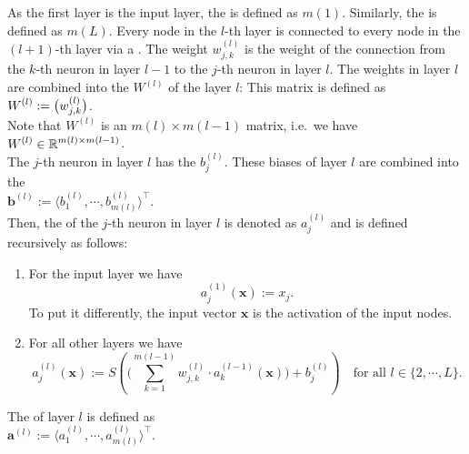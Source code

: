 As the first layer is the input layer, the  is defined as
$m(1)$.  Similarly, the  is defined as $m(L)$.
Every node in the $l$-th layer is connected to every node in the $(l+1)$-th layer via a .
The weight $w_{j,k}^{(l)}$ is the weight of the connection from the $k$-th neuron in layer $l-1$ to
the $j$-th neuron in layer $l$.  The weights in layer $l$ are combined into the  $W^{(l)}$ of
the layer $l$: This matrix is defined as
\\[0.2cm]
\hspace*{1.3cm}
$\displaystyle W^{(l)} := \bigl( w_{j,k}^{(l)} \bigr)$.
\\[0.2cm]
Note that $W^{(l)}$ is an $m(l) \times m(l-1)$ matrix, i.e.~we have
\\[0.2cm]
\hspace*{1.3cm}
$\displaystyle W^{(l)} \in \mathbb{R}^{m(l) \times m(l-1)}$.
\\[0.2cm]
The $j$-th neuron in layer $l$ has the  $b_j^{(l)}$.  These biases of layer $l$ are combined into
the 
\\[0.2cm]
\hspace*{1.3cm}
$\mathbf{b}^{(l)} := \langle b_1^{(l)}, \cdots, b_{m(l)}^{(l)} \rangle^\top$.
\\[0.2cm]
Then, the  of the $j$-th neuron
in layer $l$ is denoted as $a_j^{(l)}$ and is defined recursively as follows:
\begin{enumerate}
\item For the input layer we have
      \begin{equation}
        \label{eq:feedforward1}
       a^{(1)}_j(\mathbf{x}) := x_j.
       \tag{FF1}
      \end{equation}
      To put it differently, the input vector $\mathbf{x}$ is the activation of the input nodes.
\item For all other layers we have
      \begin{equation}
         \label{eq:feedforward2}
         a_j^{(l)}(\mathbf{x}) := 
             S\left(\Biggl(\sum\limits_{k=1}^{m(l-1)} w_{j,k}^{(l)}\cdot a_k^{(l-1)}(\mathbf{x})\Biggr) + b_{j}^{(l)}\right) 
        \quad \mbox{for all $l \in \{2, \cdots, L\}$}.
       \tag{FF2}
\end{equation}
\end{enumerate}
The  of layer $l$ is defined as
\\[0.2cm]
\hspace*{1.3cm}
$\mathbf{a}^{(l)} := \langle a_1^{(l)}, \cdots, a_{m(l)}^{(l)} \rangle^\top$.
